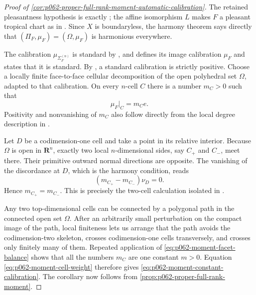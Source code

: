 \begin{proof}[Proof of
\cref{cor:p062-proper-full-rank-moment-automatic-calibration}]
The retained pleasantness hypothesis is exactly
\cite[Definition~14.1.7]{CLD25}; the affine isomorphism $L$ makes $F$ a
pleasant tropical chart as in \cite[Definition~5.4.3]{CLD25}.  Since $X$
is boundaryless, the harmony theorem \cite[Theorem~6.6.8]{CLD25} says
directly that $(\Pi_F,\mu_F)=(\Omega,\mu_F)$ is harmonious everywhere.

The calibration $\mu_{\Sigma_F^{(n)}}$ is standard by
\cite[Definition~14.3.5]{CLD25}, and
\cite[Definition~14.5.1]{CLD25} defines its image calibration $\mu_F$ and
states that it is standard.  By \cite[Definition~4.5.1]{CLD25}, a standard
calibration is strictly positive.  Choose a locally finite face-to-face
cellular decomposition of the open polyhedral set $\Omega$, adapted to
that calibration.  On every $n$-cell $C$ there is a number $m_C>0$ such
that
\begin{equation}
\label{eq:p062-moment-cell-weight}
                              \mu_F|_C=m_Ce.
\end{equation}
Positivity and nonvanishing of $m_C$ also follow directly from the local
degree description in \cite[\S14.5.2]{CLD25}.

Let $D$ be a codimension-one cell and take a point in its relative interior.
Because $\Omega$ is open in $\mathbf R^n$, exactly two local
$n$-dimensional sides, say $C_+$ and $C_-$, meet there.  Their primitive
outward normal directions are opposite.  The vanishing of the discordance
at $D$, which is the harmony condition, reads
\begin{equation}
\label{eq:p062-moment-facet-balance}
                         (m_{C_+}-m_{C_-})\nu_D=0.
\end{equation}
Hence $m_{C_+}=m_{C_-}$.
This is precisely the two-cell calculation isolated in
\cite[Remark~4.6.10]{CLD25}.

Any two top-dimensional cells can be connected by a polygonal path in the
connected open set $\Omega$.  After an arbitrarily small perturbation on
the compact image of the path, local finiteness lets us arrange that the
path avoids the codimension-two skeleton, crosses codimension-one cells
transversely, and crosses only finitely many of them.  Repeated application
of \eqref{eq:p062-moment-facet-balance} shows that all the numbers $m_C$
are one constant $m>0$.  Equation
\eqref{eq:p062-moment-cell-weight} therefore gives
\eqref{eq:p062-moment-constant-calibration}.  The corollary now follows
from \cref{prop:p062-proper-full-rank-moment}.
\end{proof}

